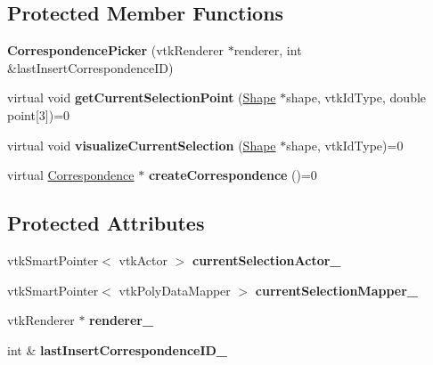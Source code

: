 \subsection*{Protected Member Functions}
\begin{DoxyCompactItemize}
\item 
\hypertarget{class_correspondence_picker_a70285e89add0a5df7596bdddc0f132b7}{}{\bfseries Correspondence\+Picker} (vtk\+Renderer $\ast$renderer, int \&last\+Insert\+Correspondence\+I\+D)\label{class_correspondence_picker_a70285e89add0a5df7596bdddc0f132b7}

\item 
\hypertarget{class_correspondence_picker_a14b40e8ee44c95e360d6f7665267c6df}{}virtual void {\bfseries get\+Current\+Selection\+Point} (\hyperlink{class_shape}{Shape} $\ast$shape, vtk\+Id\+Type, double point\mbox{[}3\mbox{]})=0\label{class_correspondence_picker_a14b40e8ee44c95e360d6f7665267c6df}

\item 
\hypertarget{class_correspondence_picker_ac6d3217637060205e72e6ae19096f812}{}virtual void {\bfseries visualize\+Current\+Selection} (\hyperlink{class_shape}{Shape} $\ast$shape, vtk\+Id\+Type)=0\label{class_correspondence_picker_ac6d3217637060205e72e6ae19096f812}

\item 
\hypertarget{class_correspondence_picker_a2470d78722d9d164323cd820aa9f572a}{}virtual \hyperlink{class_correspondence}{Correspondence} $\ast$ {\bfseries create\+Correspondence} ()=0\label{class_correspondence_picker_a2470d78722d9d164323cd820aa9f572a}

\end{DoxyCompactItemize}
\subsection*{Protected Attributes}
\begin{DoxyCompactItemize}
\item 
\hypertarget{class_correspondence_picker_a6fecd46b5c6eb12d55cf62b4dbdf8b1f}{}vtk\+Smart\+Pointer$<$ vtk\+Actor $>$ {\bfseries current\+Selection\+Actor\+\_\+}\label{class_correspondence_picker_a6fecd46b5c6eb12d55cf62b4dbdf8b1f}

\item 
\hypertarget{class_correspondence_picker_a3e59d81ec22903c96d330d0c3aee16e4}{}vtk\+Smart\+Pointer$<$ vtk\+Poly\+Data\+Mapper $>$ {\bfseries current\+Selection\+Mapper\+\_\+}\label{class_correspondence_picker_a3e59d81ec22903c96d330d0c3aee16e4}

\item 
\hypertarget{class_correspondence_picker_aac2fd778113fa0b6a0668a0ffd83ab86}{}vtk\+Renderer $\ast$ {\bfseries renderer\+\_\+}\label{class_correspondence_picker_aac2fd778113fa0b6a0668a0ffd83ab86}

\item 
\hypertarget{class_correspondence_picker_adae7b5e7bb605c1e93753bf4e42beadd}{}int \& {\bfseries last\+Insert\+Correspondence\+I\+D\+\_\+}\label{class_correspondence_picker_adae7b5e7bb605c1e93753bf4e42beadd}

\end{DoxyCompactItemize}


